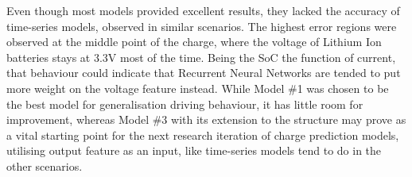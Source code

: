 %
%
Even though most models provided excellent results, they lacked the accuracy of time-series models, observed in similar scenarios.
The highest error regions were observed at the middle point of the charge, where the voltage of Lithium Ion batteries stays at 3.3V most of the time.
Being the SoC the function of current, that behaviour could indicate that Recurrent Neural Networks are tended to put more weight on the voltage feature instead.
While Model \#1 was chosen to be the best model for generalisation driving behaviour, it has little room for improvement, whereas Model \#3 with its extension to the structure may prove as a vital starting point for the next research iteration of charge prediction models, utilising output feature as an input, like time-series models tend to do in the other scenarios.
